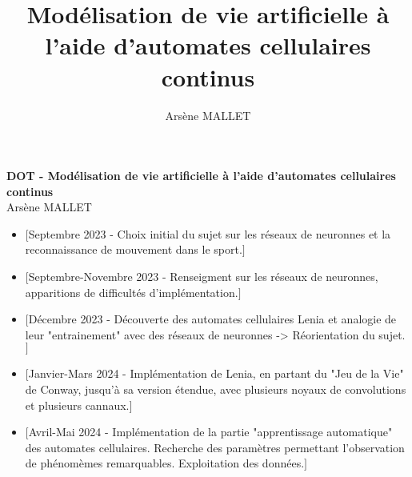 \documentclass[a4paper, 11pt]{article}
\author{Arsène MALLET}
\title{Mod\'elisation de vie artificielle à l'aide d'automates cellulaires continus}
\begin{document}
    
\begin{center}
    {\textbf {\LARGE DOT - Mod\'elisation de vie artificielle à l'aide d'automates cellulaires continus}} \\
    \vspace{3mm}
    {\small Arsène MALLET}
\end{center}

\vspace{5mm}

\begin{itemize}
    \item $\bigl[$Septembre 2023 - Choix initial du sujet sur les r\'eseaux de neuronnes et la reconnaissance de mouvement dans le sport.$\bigr]$
    \item $\bigl[$Septembre-Novembre 2023 - Renseigment sur les r\'eseaux de neuronnes, apparitions de difficult\'es d'impl\'ementation.$\bigr]$
    \item $\bigl[$D\'ecembre 2023 - D\'ecouverte des automates cellulaires Lenia et analogie de leur "entrainement" avec des r\'eseaux de neuronnes -> R\'eorientation du sujet. $\bigr]$
    \item $\bigl[$Janvier-Mars 2024 -  Impl\'ementation de Lenia, en partant du "Jeu de la Vie" de Conway, jusqu'\`a sa version \'etendue, avec plusieurs noyaux de convolutions et plusieurs cannaux.$\bigr]$
    \item $\bigl[$Avril-Mai 2024 - Impl\'ementation de la partie "apprentissage automatique" des automates cellulaires. Recherche des param\`etres permettant l'observation de ph\'enom\`emes remarquables. Exploitation des donn\'ees.$\bigr]$
\end{itemize}
\end{document}
